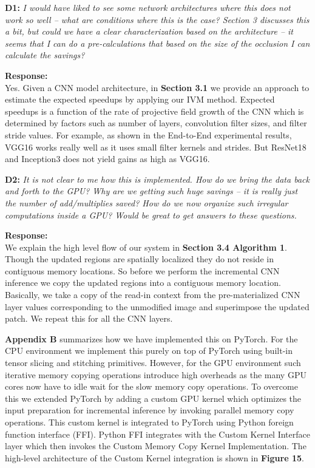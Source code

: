 \documentclass[preprint]{vldb}
\begin{document}
\vspace{2mm}
\noindent \textbf{D1:} \textit{I would have liked to see some network architectures where this does not work so well -- what are conditions where this is the case? Section 3 discusses this a bit, but could we have a clear characterization based on the architecture -- it seems that I can do a pre-calculations that based on the size of the occlusion I can calculate the savings?}

\vspace{2mm}
\noindent \textbf{Response:}\\
Yes. Given a CNN model architecture, in \textbf{Section 3.1} we provide an approach to estimate the expected speedups by applying our IVM method. Expected speedups is a function of the rate of projective field growth of the CNN which is determined by factors such as number of layers, convolution filter sizes, and filter stride values. For example, as shown in the End-to-End experimental results, VGG16 works really well as it uses small filter kernels and strides. But ResNet18 and Inception3 does not yield gains as high as VGG16.

\vspace{2mm}
\noindent \textbf{D2:} \textit{It is not clear to me how this is implemented. How do we bring the data back and forth to the GPU? Why are we getting such huge savings -- it is really just the number of add/multiplies saved? How do we now organize such irregular computations inside a GPU? Would be great to get answers to these questions.}

\vspace{2mm}
\noindent \textbf{Response:}\\
We explain the high level flow of our system in \textbf{Section 3.4 Algorithm 1}.
Though the updated regions are spatially localized they do not reside in contiguous memory locations. So before we perform the incremental CNN inference we copy the updated regions into a contiguous memory location.
Basically, we take a copy of the read-in context from the pre-materialized CNN layer values corresponding to the unmodified image and superimpose the updated patch.
We repeat this for all the CNN layers.

\textbf{Appendix B} summarizes how we have implemented this on PyTorch.
For the CPU environment we implement this purely on top of PyTorch using built-in tensor slicing and stitching primitives.
However, for the GPU environment such iterative memory copying operations introduce high overheads as the many GPU cores now have to idle wait for the slow memory copy operations. To overcome this we extended PyTorch by adding a custom GPU kernel which optimizes the input preparation for incremental inference by invoking parallel memory copy operations. This custom kernel is integrated to PyTorch using Python foreign function interface (FFI). Python FFI integrates with the Custom Kernel Interface layer which then invokes the Custom Memory Copy Kernel Implementation. The high-level architecture of the Custom Kernel integration is shown in \textbf{Figure 15}.
\end{document}
